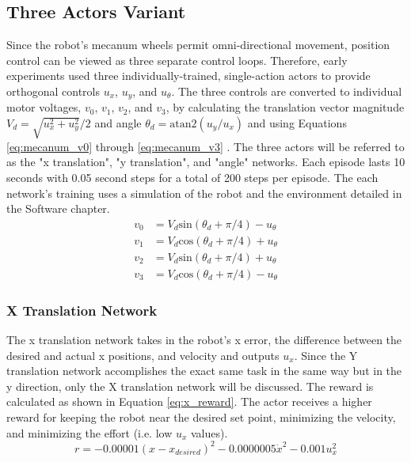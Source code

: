 \subsection{Three Actors Variant}
Since the robot's mecanum wheels permit omni-directional movement, position control can be viewed as three separate control loops. Therefore, early experiments used three individually-trained, single-action actors to provide orthogonal controls $u_x$, $u_y$, and $u_\theta$. The three controls are converted to individual motor voltages, $v_0$, $v_1$, $v_2$, and $v_3$, by calculating the translation vector magnitude $V_d = \sqrt{u_x^2 + u_y^2}/2$ and angle $\theta_d = \text{atan2}(u_y / u_x)$ and using Equations \ref{eq:mecanum_v0} through \ref{eq:mecanum_v3} \cite{li_2018}\cite{rahman_2014}. The three actors will be referred to as the "x translation", "y translation", and "angle" networks. Each episode lasts 10 seconds with 0.05 second steps for a total of 200 steps per episode. The each network's training uses a simulation of the robot and the environment detailed in the Software chapter.
\begin{align}
v_0 &= V_d \text{sin}(\theta_d + \pi/4) - u_\theta  \label{eq:mecanum_v0}\\
v_1 &= V_d \text{cos}(\theta_d + \pi/4) + u_\theta  \label{eq:mecanum_v1}\\
v_2 &= V_d \text{sin}(\theta_d + \pi/4) + u_\theta  \label{eq:mecanum_v2}\\
v_3 &= V_d \text{cos}(\theta_d + \pi/4) - u_\theta  \label{eq:mecanum_v3}
\end{align}

\subsubsection{X Translation Network}
The x translation network takes in the robot's x error, the difference between the desired and actual x positions, and velocity and outputs $u_x$. Since the Y translation network accomplishes the exact same task in the same way but in the y direction, only the X translation network will be discussed. The reward is calculated as shown in Equation \ref{eq:x_reward}. The actor receives a higher reward for keeping the robot near the desired set point, minimizing the velocity, and minimizing the effort (i.e. low $u_x$ values).
\begin{equation}
r = -0.00001(x-x_{desired})^2-0.0000005\dot{x}^2-0.001u_x^2
\label{eq:x_reward}
\end{equation}

